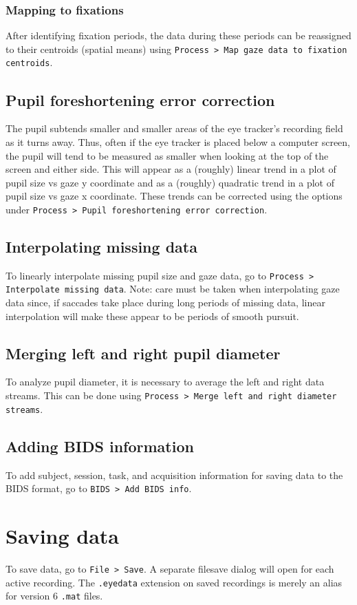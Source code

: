 \documentclass{article}
\begin{document}
\subsubsection{Mapping to fixations}
After identifying fixation periods, the data during these periods can be reassigned to their centroids (spatial means) using \texttt{Process > Map gaze data to fixation centroids}.
\subsection{Pupil foreshortening error correction}
The pupil subtends smaller and smaller areas of the eye tracker's recording field as it turns away. Thus, often if the eye tracker is placed below a computer screen, the pupil will tend to be measured as smaller when looking at the top of the screen and either side. This will appear as a (roughly) linear trend in a plot of pupil size vs gaze y coordinate and as a (roughly) quadratic trend in a plot of pupil size vs gaze x coordinate. These trends can be corrected using the options under \texttt{Process > Pupil foreshortening error correction}.
\subsection{Interpolating missing data}
To linearly interpolate missing pupil size and gaze data, go to \texttt{Process > Interpolate missing data}. Note: care must be taken when interpolating gaze data since, if saccades take place during long periods of missing data, linear interpolation will make these appear to be periods of smooth pursuit.
\subsection{Merging left and right pupil diameter}
To analyze pupil diameter, it is necessary to average the left and right data streams. This can be done using \texttt{Process > Merge left and right diameter streams}.
\subsection{Adding BIDS information}
To add subject, session, task, and acquisition information for saving data to the BIDS format, go to \texttt{BIDS > Add BIDS info}.

\section{Saving data}
To save data, go to \texttt{File > Save}. A separate filesave dialog will open for each active recording. The \texttt{.eyedata} extension on saved recordings is merely an alias for version 6 \texttt{.mat} files.
\end{document}
